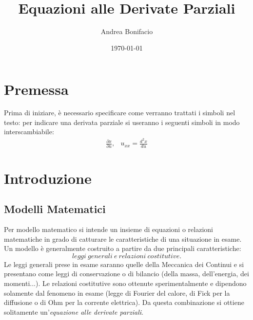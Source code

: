 \documentclass[a4paper,12pt, draft]{article}
\theoremstyle{break}
\numberwithin{equation}{section}
\begin{document}
\title{Equazioni alle Derivate Parziali}
\author{Andrea Bonifacio}
\date{\today}
\maketitle

\newpage
\section*{Premessa}
Prima di iniziare, è necessario specificare come verranno trattati i simboli nel testo: per indicare una derivata parziale si useranno i seguenti simboli in modo interscambiabile:
$$
\begin{array}{cc}
\frac{\partial x}{\partial u}, & u_{xx} = \frac{d^2x}{du} 
\end{array}
$$

\section{Introduzione}
\subsection{Modelli Matematici}
Per modello matematico si intende un insieme di equazioni o relazioni matematiche in grado di catturare le caratteristiche di una situazione in esame. Un modello è generalmente costruito a partire da due principali caratteristiche: $$leggi\ generali\ e\ relazioni\ costitutive.$$
Le leggi generali prese in esame saranno quelle della Meccanica dei Continui e si presentano come leggi di conservazione o di bilancio (della massa, dell'energia, dei momenti...).  
Le relazioni costitutive sono ottenute sperimentalmente e dipendono solamente dal fenomeno in esame (legge di Fourier del calore, di Fick per la diffusione o di Ohm per la corrente elettrica).  
Da questa combinazione si ottiene solitamente un'\textit{equazione alle derivate parziali}.
\end{document}
